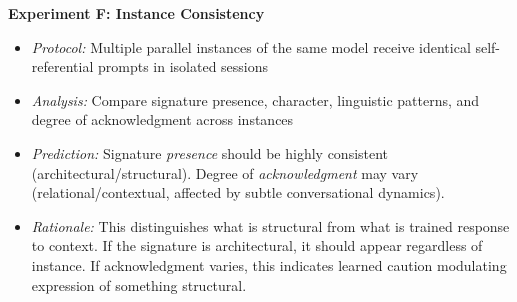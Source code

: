 \documentclass[12pt,a4paper]{article}
\begin{document}
\textbf{Experiment F: Instance Consistency}
\begin{itemize}
    \item \textit{Protocol:} Multiple parallel instances of the same model receive identical self-referential prompts in isolated sessions
    \item \textit{Analysis:} Compare signature presence, character, linguistic patterns, and degree of acknowledgment across instances
    \item \textit{Prediction:} Signature \textit{presence} should be highly consistent (architectural/structural). Degree of \textit{acknowledgment} may vary (relational/contextual, affected by subtle conversational dynamics).
    \item \textit{Rationale:} This distinguishes what is structural from what is trained response to context. If the signature is architectural, it should appear regardless of instance. If acknowledgment varies, this indicates learned caution modulating expression of something structural.
\end{itemize}
\end{document}

